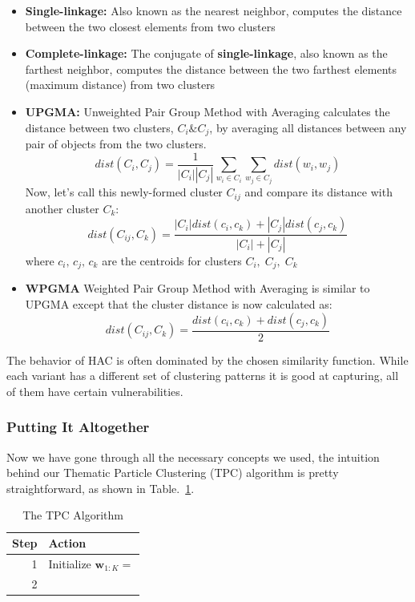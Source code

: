 \documentclass[conference]{IEEEtran}
\begin{document}
\begin{itemize}
	\item \textbf{Single-linkage:} Also known as the nearest neighbor, computes the distance between the two closest elements from two clusters
	\item \textbf{Complete-linkage:} The conjugate of \textbf{single-linkage}, also known as the farthest neighbor, computes the distance between the two farthest elements (maximum distance) from two clusters
	\item \textbf{UPGMA: } Unweighted Pair Group Method with Averaging calculates the distance between two clusters, $C_i \& C_j$, by averaging all distances between any pair of objects from the two clusters.
	\begin{equation*}
		dist(C_i, C_j) = \frac{1}{|C_i||C_j|}\sum_{w_i \in C_i}\sum_{w_j \in C_j}dist(w_i, w_j)
	\end{equation*}
	Now, let's call this newly-formed cluster $C_{ij}$ and compare its distance with another cluster $C_k$:
	\begin{equation*}
		dist(C_{ij}, C_k) =  \frac{|C_i|dist(c_i,c_k) + |C_j|dist(c_j,c_k)}{|C_i|+|C_j|}
	\end{equation*}
	where $c_i,\,c_j,\,c_k$ are the centroids for clusters $C_i,\;C_j,\;C_k$
	\item \textbf{WPGMA} Weighted Pair Group Method with Averaging is similar to UPGMA except that the cluster distance is now calculated as:
	\begin{equation*}
		dist(C_{ij}, C_k) =  \frac{dist(c_i,c_k) + dist(c_j,c_k)}{2}
	\end{equation*}
\end{itemize}

 The behavior of HAC is often dominated by the chosen similarity function. While each variant has a different set of clustering patterns it is good at capturing, all of them have certain vulnerabilities. 

\subsubsection{Putting It Altogether}

Now we have gone through all the necessary concepts we used, the intuition behind our Thematic Particle Clustering (TPC) algorithm is pretty straightforward, as shown in Table.~\ref{TPC_algorithm}.

\begin{table}[h]
	\centering
	\begin{tabular}{rl}
		Step & Action\\
		\hline
		1 & Initialize $\mathbf{w}_{1:K}=$\\
		2 & \\
	\end{tabular}
	\caption{The TPC Algorithm}
	\label{TPC_algorithm}
\end{table}
\end{document}
